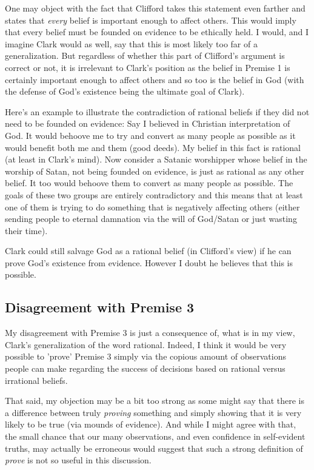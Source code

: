 \documentclass{article}
\begin{document}
One may object with the fact that Clifford takes this statement even farther and states that \textit{every} belief is important enough to affect others. This would imply that every belief must be founded on evidence to be ethically held. I would, and I imagine Clark would as well, say that this is most likely too far of a generalization. But regardless of whether this part of Clifford's argument is correct or not, it is irrelevant to Clark's position as the belief in Premise 1 is certainly important enough to affect others and so too is the belief in God (with the defense of God's existence being the ultimate goal of Clark).

Here's an example to illustrate the contradiction of rational beliefs if they did not need to be founded on evidence: Say I believed in Christian interpretation of God. It would behoove me to try and convert as many people as possible as it would benefit both me and them (good deeds). My belief in this fact is rational (at least in Clark's mind). Now consider a Satanic worshipper whose belief in the worship of Satan, not being founded on evidence, is just as rational as any other belief. It too would behoove them to convert as many people as possible. The goals of these two groups are entirely contradictory and this means that at least one of them is trying to do something that is negatively affecting others (either sending people to eternal damnation via the will of God/Satan or just wasting their time).

Clark could still salvage God as a rational belief (in Clifford's view) if he can prove God's existence from evidence. However I doubt he believes that this is possible.

\subsection{Disagreement with Premise 3}
My disagreement with Premise 3 is just a consequence of, what is in my view, Clark's generalization of the word rational. Indeed, I think it would be very possible to 'prove' Premise 3 simply via the copious amount of observations people can make regarding the success of decisions based on rational versus irrational beliefs.

That said, my objection may be a bit too strong as some might say that there is a difference between truly \textit{proving} something and simply showing that it is very likely to be true (via mounds of evidence). And while I might agree with that, the small chance that our many observations, and even confidence in self-evident truths, may actually be erroneous would suggest that such a strong definition of \textit{prove} is not so useful in this discussion.
\end{document}
